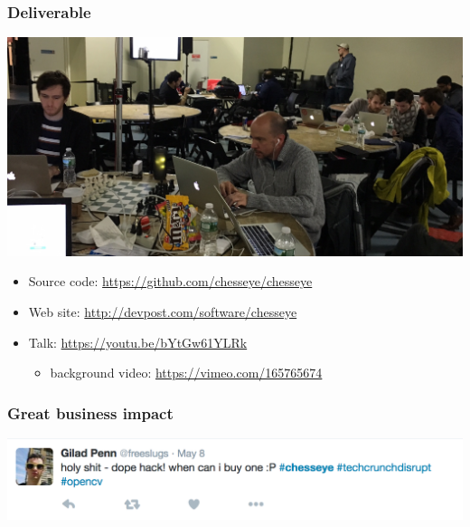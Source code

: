 \documentclass[t]{beamer}
\begin{document}
\begin{frame}[fragile]
\frametitle{Deliverable}

\begin{center}
  \includegraphics[scale=0.15]{figures/photo-deliverable}
\end{center}

\begin{itemize}
\item Source code: \url{https://github.com/chesseye/chesseye}
  \medskip
\item Web site: \url{http://devpost.com/software/chesseye}
  \medskip
\item Talk: \url{https://youtu.be/bYtGw61YLRk}
  \begin{itemize}
  \item background video: \url{https://vimeo.com/165765674}
  \end{itemize}
\end{itemize}


\end{frame}


\begin{frame}[fragile]
\frametitle{Great business impact}

\begin{center}
  \includegraphics[scale=0.6]{figures/tweet2}
\end{center}

\end{frame}




\end{document}
